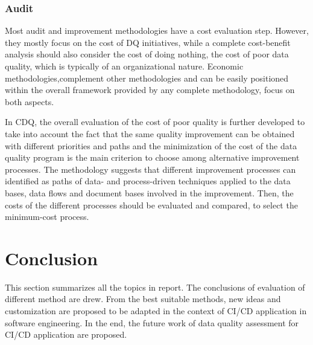 \documentclass[pdftex,english,oribibl]{llncs}
\begin{document}
\subsubsection{Audit} Most audit and improvement methodologies have a cost evaluation step. However, they mostly focus on the cost of DQ initiatives, while a complete cost-benefit analysis should also consider the cost of doing nothing, the cost of poor data quality, which is typically of an organizational nature. Economic methodologies,complement other methodologies and can be easily positioned within the overall framework provided by any complete methodology, focus on both aspects.

In CDQ, the overall evaluation of the cost of poor quality is further developed to take into account the fact that the same quality improvement can be obtained with different priorities and paths and the minimization of the cost of the data quality program is the main criterion to choose among alternative improvement processes.
The methodology suggests that different improvement processes can identified as paths of data- and process-driven techniques applied to the data bases, data flows and document bases involved in the improvement. Then, the costs of the different processes should be evaluated and compared, to select the minimum-cost process.
\begin{comment}

Experiences of use of early TDQM versions are reported in several U.S.A. Department of Defence (DoD) documents (see US Department of Defense [1994]). Specifically, the use of DQ tools developed over SQL scripts and programming approaches to check data quality are supported.
In Batini and Scannapieco [2006], a large-scale experience of the application of CDQ is reported, referring to the reorganization of Government to Business (G2B) relation- ships in Italy. The interactions with government are needed for several business events, such as starting a new business and evolving a business, which includes variations in legal status, board composition, senior management, and number of employees.
\end{comment}

\section{Conclusion}
This section summarizes all the topics in report.
The conclusions of evaluation of different method are drew.
From the best suitable methods, new ideas and customization are proposed to be adapted in the context of CI/CD application in software engineering.
In the end, the future work of data quality assessment for CI/CD application are proposed.

\end{document}
